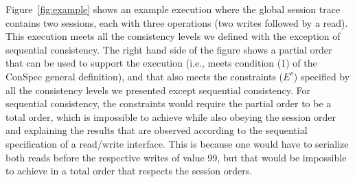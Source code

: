 \documentclass[journal,compsoc]{IEEEtran}
\begin{document}
 Figure~\ref{fig:example} shows an example execution where the global session trace contains two sessions, each with three operations (two writes followed by a read). This execution meets all the consistency levels we defined with the exception of sequential consistency. The right hand side of the figure shows a partial order that %
  can be used to support the execution (i.e., meets condition (1) of the ConSpec general definition), and that also meets the constraints ($E^s$) specified by all the consistency levels we presented except sequential consistency. For sequential consistency, the constraints would require the partial order to be a total order, which is impossible to achieve while also obeying the session order and explaining the results that are observed according to the sequential specification of a read/write interface. This is because one would have to serialize both reads before the respective writes of value 99, but that would be impossible to achieve in a total order that respects the session orders.
\end{document}
